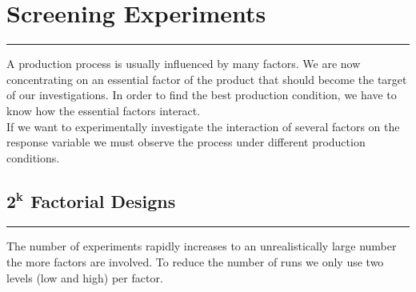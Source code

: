 \section{Screening Experiments}
\noindent\rule[\linienAbstand]{\linewidth}{\linienDickeDick}
A production process is usually influenced by many factors. We are now concentrating on an essential factor of the product that
should become the target of our investigations. In order to find the best production condition, we have to know how the essential factors interact.\\
If we want to experimentally investigate the interaction of several factors on the response variable we must observe the process under different production conditions.

\subsection{$\mathbf{2^k}$ Factorial Designs}
\noindent\rule[\linienAbstand]{\linewidth}{\linienDicke}
The number of experiments rapidly increases to an unrealistically large number the more factors are involved. To reduce the number of runs we only use two levels (low and high) per factor.\\

